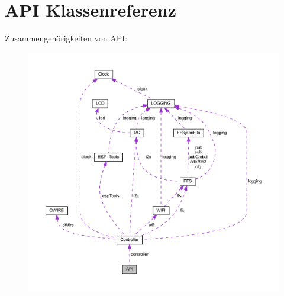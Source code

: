 \hypertarget{class_a_p_i}{}\section{A\+PI Klassenreferenz}
\label{class_a_p_i}


Zusammengehörigkeiten von A\+PI\+:\nopagebreak
\begin{figure}[H]
\begin{center}
\leavevmode
\includegraphics[width=350pt]{class_a_p_i__coll__graph}
\end{center}
\end{figure}
